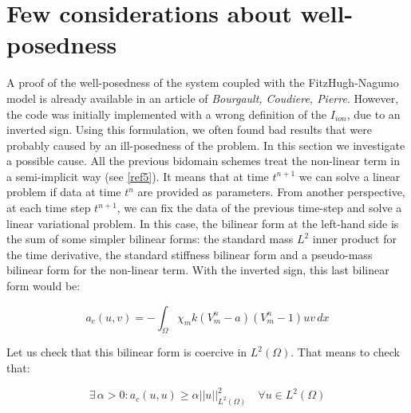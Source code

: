 \documentclass[a4paper]{article}
\begin{document}
\section{Few considerations about well-posedness}
A proof of the well-posedness of the system coupled with the FitzHugh-Nagumo model is already available in an article of \emph{Bourgault, Coudiere, Pierre}. However, the code was initially implemented with a wrong definition of the $I_{ion}$, due to an inverted sign. Using this formulation, we often found bad results that were probably caused by an ill-posedness of the problem. In this section we investigate a possible cause. \newline
All the previous bidomain schemes treat the non-linear term in a semi-implicit way (see \ref{ref5}). It means that at time $t^{n+1}$ we can solve a linear problem if data at time $t^n$ are provided as parameters. From another perspective, at each time step $t^{n+1}$, we can fix the data of the previous time-step and solve a linear variational problem. In this case, the bilinear form at the left-hand side is the sum of some simpler bilinear forms: the standard mass $L^2$ inner product for the time derivative, the standard stiffness bilinear form and a pseudo-mass bilinear form for the non-linear term. With the inverted sign, this last bilinear form would be: \newline

\begin{equation}
a_c(u,v) = -\int_\Omega \chi_mk(V_m^{n}-a)(V_m^{n}-1)uv \, dx
\end{equation}

\noindent Let us check that this bilinear form is coercive in $L^2(\Omega)$. That means to check that:

\begin{equation}
\exists \, \alpha>0: a_c(u,u) \ge \alpha ||u||^2_{L^2(\Omega)} \quad \forall u \in L^2(\Omega)
\end{equation}
\end{document}
